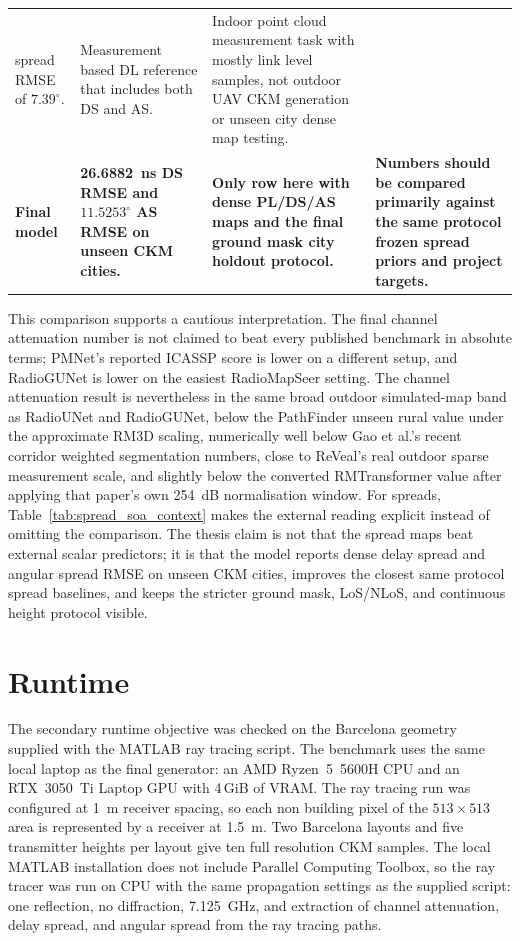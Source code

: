 \begin{table}[!htbp]
\begin{tabularx}{\textwidth}{>{\raggedright\arraybackslash}p{}
>{\raggedright\arraybackslash}p{}
>{\raggedright\arraybackslash}p{}
>{\raggedright\arraybackslash}X}
spread RMSE of \(7.39^\circ\). &
Measurement based DL reference that includes both DS and AS. &
Indoor point cloud measurement task with mostly link level samples, not outdoor
UAV CKM generation or unseen city dense map testing. \\
\textbf{Final model} &
\textbf{\SI{26.6882}{ns} DS RMSE and \(11.5253^\circ\) AS RMSE on unseen CKM
cities.} &
\textbf{Only row here with dense PL/DS/AS maps and the final ground mask
city holdout protocol.} &
\textbf{Numbers should be compared primarily against the same protocol frozen
spread priors and project targets.} \\
\bottomrule
\end{tabularx}
\endgroup
\end{table}

This comparison supports a cautious interpretation. The final channel attenuation number
is not claimed to beat every published benchmark in absolute terms; PMNet's
reported ICASSP score is lower on a different setup, and RadioGUNet is lower
on the easiest RadioMapSeer setting. The channel attenuation result is nevertheless in the
same broad outdoor simulated-map band as RadioUNet and RadioGUNet, below the
PathFinder unseen rural value under the approximate RM3D scaling, numerically
well below Gao et al.'s recent corridor weighted segmentation numbers, close to
ReVeal's real outdoor sparse measurement scale, and slightly below the converted
RMTransformer value after applying that paper's own \SI{254}{dB} normalisation
window.
For spreads, Table~\ref{tab:spread_soa_context} makes the external reading
explicit instead of omitting the comparison. The thesis claim is not that the
spread maps beat external scalar predictors; it is that the model reports dense
delay spread and angular spread RMSE on unseen CKM cities, improves the closest
same protocol spread baselines, and keeps the stricter ground mask, LoS/NLoS,
and continuous height protocol visible.

\section{Runtime}
\label{sec:runtime}

The secondary runtime objective was checked on the Barcelona geometry supplied
with the MATLAB ray tracing script. The benchmark uses the same local laptop as
the final generator: an AMD Ryzen~5~5600H CPU and an RTX~3050~Ti Laptop GPU
with 4\,GiB of VRAM. The ray tracing run was configured at
\SI{1}{m} receiver spacing, so each non building pixel of the \(513\times513\)
area is represented by a receiver at \SI{1.5}{m}. Two Barcelona layouts and five
transmitter heights per layout give ten full resolution CKM samples. The local MATLAB
installation does not include Parallel Computing Toolbox, so the ray tracer was
run on CPU with the same propagation settings as the supplied script:
one reflection, no diffraction, \SI{7.125}{GHz}, and extraction of channel attenuation,
delay spread, and angular spread from the ray tracing paths.

